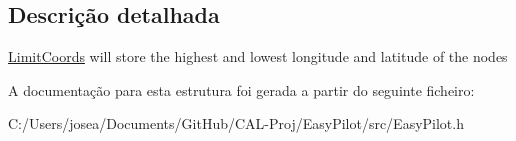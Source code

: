 \subsection{Descrição detalhada}
\hyperlink{struct_limit_coords}{Limit\+Coords} will store the highest and lowest longitude and latitude of the nodes 

A documentação para esta estrutura foi gerada a partir do seguinte ficheiro\+:\begin{DoxyCompactItemize}
\item 
C\+:/\+Users/josea/\+Documents/\+Git\+Hub/\+C\+A\+L-\/\+Proj/\+Easy\+Pilot/src/Easy\+Pilot.\+h\end{DoxyCompactItemize}
